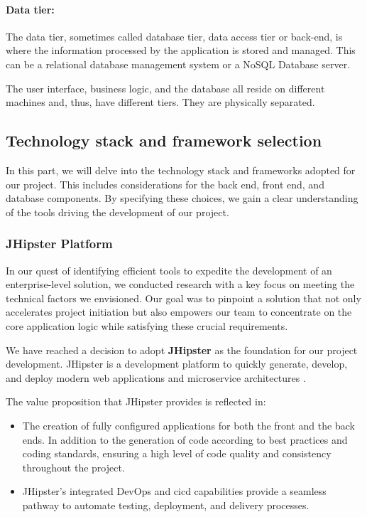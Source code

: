\paragraph*{Data tier:}
The data tier, sometimes called database tier, data access tier or back-end, is where the information
processed by the application is stored and managed. This can be a relational database management system
or a NoSQL Database server.

The user interface, business logic, and the database all reside on different machines and, thus, have
different tiers. They are physically separated.


\subsection{Technology stack and framework selection}
In this part, we will delve into the technology stack and frameworks adopted for our project.
This includes considerations for the back end, front end, and database components. By specifying
these choices, we gain a clear understanding of the tools driving the development of our project.

\subsubsection{JHipster Platform}
In our quest of identifying efficient tools to expedite the development of an enterprise-level solution,
we conducted research with a key focus on meeting the technical factors we envisioned. Our goal was to
pinpoint a solution that not only accelerates project initiation but also empowers our team to concentrate
on the core application logic while satisfying these crucial requirements.

We have reached a decision to adopt \textbf{JHipster} as the foundation for our project development.
JHipster is a development platform to quickly generate, develop, and deploy modern web applications
and microservice architectures \cite{jhipster}.

\noindent The value proposition that JHipster provides is reflected in:

\begin{itemize}
      \item The creation of fully configured applications for both the front and the back ends.
            In addition to the generation of code according to best practices and coding standards,
            ensuring a high level of code quality and consistency throughout the project.
      \item JHipster's integrated DevOps and \acrshort{cicd} capabilities provide a seamless pathway
            to automate testing, deployment, and delivery processes.
\end{itemize}


